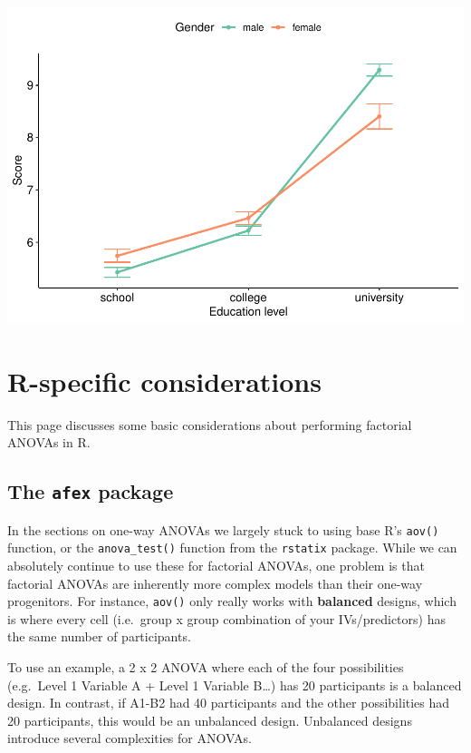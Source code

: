 \documentclass[
]{book}
\begin{document}
\includegraphics{_main_files/figure-latex/unnamed-chunk-217-1.pdf}

\hypertarget{r-specific-considerations}{%
\section{R-specific considerations}\label{r-specific-considerations}}

This page discusses some basic considerations about performing factorial ANOVAs in R.

\hypertarget{the-afex-package}{%
\subsection{\texorpdfstring{The \texttt{afex} package}{The afex package}}\label{the-afex-package}}

In the sections on one-way ANOVAs we largely stuck to using base R's \texttt{aov()} function, or the \texttt{anova\_test()} function from the \texttt{rstatix} package. While we can absolutely continue to use these for factorial ANOVAs, one problem is that factorial ANOVAs are inherently more complex models than their one-way progenitors. For instance, \texttt{aov()} only really works with \textbf{balanced} designs, which is where every cell (i.e.~group x group combination of your IVs/predictors) has the same number of participants.

To use an example, a 2 x 2 ANOVA where each of the four possibilities (e.g.~Level 1 Variable A + Level 1 Variable B\ldots) has 20 participants is a balanced design. In contrast, if A1-B2 had 40 participants and the other possibilities had 20 participants, this would be an unbalanced design. Unbalanced designs introduce several complexities for ANOVAs.
\end{document}
